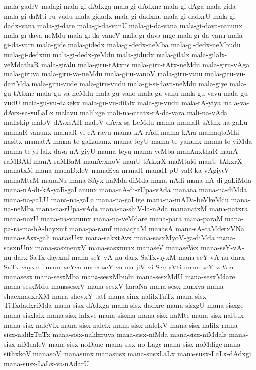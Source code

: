 {mala-gadeV
malagi
mala-gi-dAdxga
mala-gi-dAdxne
mala-gi-dAga
mala-gida
mala-gi-daMti-ru-vudu
mala-gidadx
mala-gi-dadxnu
mala-gi-dadxrU
mala-gi-dadx-vana
mala-gi-dare
mala-gi-da-vanU
mala-gi-da-vana
mala-gi-dava-nanunx
mala-gi-dava-neMdu
mala-gi-da-vaneV
mala-gi-dava-nige
mala-gi-da-vanu
mala-gi-da-varu
mala-gide
mala-gidedx
mala-gi-dedx-neMba
mala-gi-dedx-neMbudu
mala-gi-dedxnu
mala-gi-dedx-yeMdu
mala-gidudx
mala-gilalx
mala-gilalx-veMdathaR
mala-giralu
mala-giru-tAtxne
mala-giru-tAtx-neMdu
mala-giru-vAga
mala-giruva
mala-giru-va-neMdu
mala-giru-vanoV
mala-giru-vanu
mala-giru-vu-dariMda
mala-giru-vude
mala-giru-vudu
mala-gi-si-dava-neMdu
mala-giye
mala-gu-tAtxne
mala-gu-va-neMdu
mala-gu-vano
mala-gu-vanu
mala-gu-vavu
mala-gu-vudU
mala-gu-vu-dakekx
mala-gu-vu-dilalx
mala-gu-vudu
mala-tA-yiya
mala-va-dAvx-sa-vuLaLx
malavu
malilxge
mali-na-citatx-rA-da-vara
mali-na-vAda
mallskip
maloV-dAvxsAH
maloV-dAvx-sa-LeMdu
mama
mamaR-sAthx-na-gaLu
mamaR-vanunx
mamaR-vi-cA-ravu
mama-kA-rAdi
mama-kAra
mamaqtaMhi-nasitx
mamatA
mama-te-gaLanunx
mama-teyU
mama-te-yanunx
mama-te-yiMda
mama-te-yi-lalx-dava-nA-giyU
mama-teyu
mama-veMba
manAnxthaR
manA-raMBAtf
manA-raMBaM
manAvxnoV
manU-tAkxrX-maMtaM
manU-tAkxrX-manatxM
mana
manaDxleV
manaEva
manaH
manaH-pU-vaR-ka-vAgiyeV
manaMtaM
manaNu
mana-SAyx-naMda-diMda
mana-nAdi
mana-nA-di-gaLiMda
mana-nA-di-kA-yaR-gaLanunx
mana-nA-di-rUpa-vAda
manana
mana-na-diMda
mana-na-gaLU
mana-na-gaLa
mana-na-gaLige
mana-na-mADa-beVkeMdu
mana-na-neMba
mana-na-rUpa-vAda
mana-na-shiV-la-nAda
mananatxM
mana-natxra
mana-navU
mana-na-vanunx
mana-na-veMdare
mana-para
mana-paraM
mana-pa-ra-ma-bA-hayxmf
mana-pa-ramf
manaqtaM
manasA
mana-sA-caMderxVNa
mana-sAsx-gali
manasUsx
mana-sakxtAvx
mana-sasxMyoV-ga-diMda
mana-sasxnUnx
mana-sasxnenxV
mana-sasxnunx
manaseV
manaseVsx
mana-seY-vA-nu-darx-SaTx-dayxmf
mana-seY-vA-nu-darx-SaTxvayxM
mana-seY-vA-nu-darx-SaTx-vayxmf
mana-seYva
mana-seY-va-ma-jiV-vi-SemxVti
mana-seY-veVda
manasesx
mana-sesxMba
mana-sesxMbudu
mana-sesxMdU
mana-sesxMdare
mana-sesxMdu
manasesxV
mana-sesxV-karaNa
mana-sesx-nunxva
mana-shacxnadxrXM
mana-shevxY-tatf
mana-sinx-nalilxTuTx
mana-sisx-TiTxdadxriMda
mana-sisx-dAdxga
mana-sisx-dadxre
mana-sisxgU
mana-sisxge
mana-sisxlalx
mana-sisx-lalxve
mana-sisxna
mana-sisx-naMte
mana-sisx-nalUlx
mana-sisx-naleVlx
mana-sisx-nalelx
mana-sisx-nalelxV
mana-sisx-nalilx
mana-sisx-nalilxTuTx
mana-sisx-nalilxruva
mana-sisx-niMda
mana-sisx-niMdale
mana-sisx-niMdaleV
mana-sisx-noDane
mana-sisx-no-Lage
mana-sisx-noMdige
mana-sithxkoV
manasoV
manasunx
manasusx
mana-susxLaLx
mana-susx-LaLx-dAdxgi
mana-susx-LaLx-va-nAdarU
}
